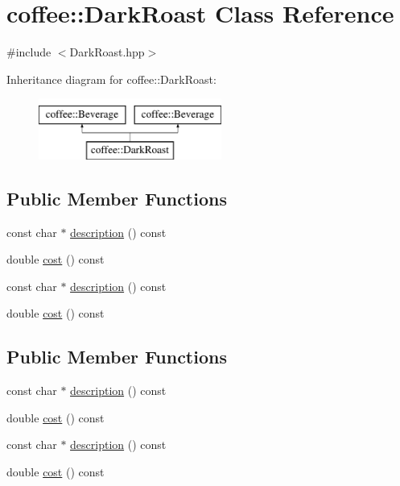 \hypertarget{classcoffee_1_1DarkRoast}{\section{coffee\-:\-:Dark\-Roast Class Reference}
\label{classcoffee_1_1DarkRoast}
}


{\ttfamily \#include $<$Dark\-Roast.\-hpp$>$}

Inheritance diagram for coffee\-:\-:Dark\-Roast\-:\begin{figure}[H]
\begin{center}
\leavevmode
\includegraphics[height=2.000000cm]{classcoffee_1_1DarkRoast}
\end{center}
\end{figure}
\subsection*{Public Member Functions}
\begin{DoxyCompactItemize}
\item 
const char $\ast$ \hyperlink{classcoffee_1_1DarkRoast_aa6220dddcb4c1bfe890d07a2cf5b113c}{description} () const 
\item 
double \hyperlink{classcoffee_1_1DarkRoast_af91170e239056b8b1543e238253493c5}{cost} () const 
\item 
const char $\ast$ \hyperlink{classcoffee_1_1DarkRoast_a77261df5dc188dcbbe61271fedf655f6}{description} () const 
\item 
double \hyperlink{classcoffee_1_1DarkRoast_af91170e239056b8b1543e238253493c5}{cost} () const 
\end{DoxyCompactItemize}
\subsection*{Public Member Functions}
\begin{DoxyCompactItemize}
\item 
const char $\ast$ \hyperlink{classcoffee_1_1Decaf_ab76517b848c6ea2dfbee332e5b294f83}{description} () const 
\item 
double \hyperlink{classcoffee_1_1Decaf_a3afc8486dfa2aeb3aca1e6aeb4de7b8d}{cost} () const 
\item 
const char $\ast$ \hyperlink{classcoffee_1_1Decaf_a91aada20d530fd6461ca13022f2b0923}{description} () const 
\item 
double \hyperlink{classcoffee_1_1Decaf_a3afc8486dfa2aeb3aca1e6aeb4de7b8d}{cost} () const 
\end{DoxyCompactItemize}

